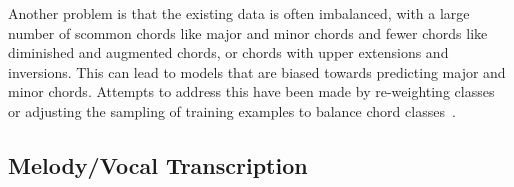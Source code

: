 Another problem is that the existing data is often imbalanced, with a large number of scommon chords like major and minor chords and fewer chords like diminished and augmented chords, or chords with upper extensions and inversions. This can lead to models that are biased towards predicting major and minor chords. Attempts to address this have been made by re-weighting classes~\citep{ACRLargeVocab1} or adjusting the sampling of training examples to balance chord classes~\citep{BalanceRandomForestACR}.


\subsection{Melody/Vocal Transcription}
